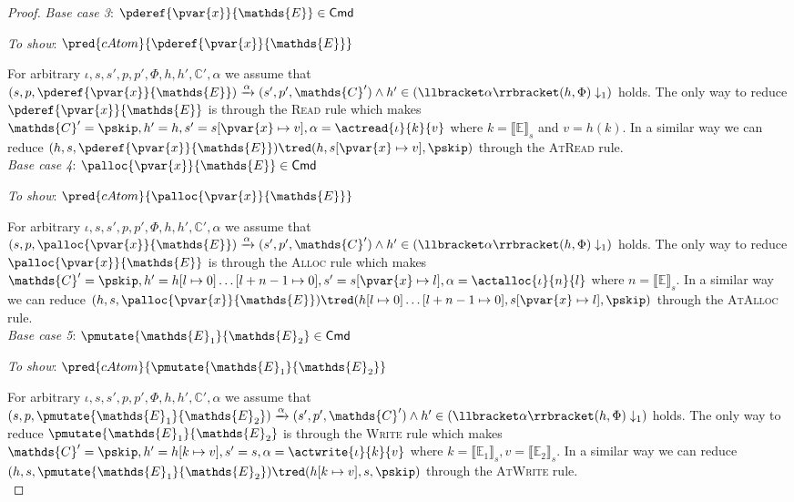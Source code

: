 \begin{lem}
{\begin{proof}
	\textit{Base case 3}: $\pderef{\pvar{x}}{\mathds{E}} \in \mathsf{Cmd}$
	
	\textit{To show}: $\pred{cAtom}{\pderef{\pvar{x}}{\mathds{E}}}$
	
	For arbitrary $\iota, s, s', p, p', \Phi, h, h', \mathds{C}', \alpha$ we assume that $(s, p, \pderef{\pvar{x}}{\mathds{E}}) \xrightarrow{\alpha} (s', p', \mathds{C}') \land h' \in \left( \llbracket \alpha \rrbracket(h, \Phi) \downarrow_1 \right)$ holds. The only way to reduce $\pderef{\pvar{x}}{\mathds{E}}$ is through the \textsc{Read} rule which makes $\mathds{C}' = \pskip, h' = h, s' = s[\pvar{x} \mapsto v], \alpha = \actread{\iota}{k}{v}$ where $k = \llbracket \mathds{E} \rrbracket_s$ and $v = h(k)$. In a similar way we can reduce $(h, s, \pderef{\pvar{x}}{\mathds{E}}) \tred (h, s[\pvar{x} \mapsto v], \pskip)$ through the \textsc{AtRead} rule. \\
	
	\textit{Base case 4}: $\palloc{\pvar{x}}{\mathds{E}} \in \mathsf{Cmd}$
	
	\textit{To show}: $\pred{cAtom}{\palloc{\pvar{x}}{\mathds{E}}}$
	
	For arbitrary $\iota, s, s', p, p', \Phi, h, h', \mathds{C}', \alpha$ we assume that $(s, p, \palloc{\pvar{x}}{\mathds{E}}) \xrightarrow{\alpha} (s', p', \mathds{C}') \land h' \in \left( \llbracket \alpha \rrbracket(h, \Phi) \downarrow_1 \right)$ holds. The only way to reduce $\palloc{\pvar{x}}{\mathds{E}}$ is through the \textsc{Alloc} rule which makes $\mathds{C}' = \pskip, h' = h[l \mapsto 0]\ldots[l + n - 1 \mapsto 0], s' = s[\pvar{x} \mapsto l], \alpha = \actalloc{\iota}{n}{l}$ where $n = \llbracket \mathds{E} \rrbracket_s$. In a similar way we can reduce $(h, s, \palloc{\pvar{x}}{\mathds{E}}) \tred (h[l \mapsto 0]\ldots[l + n - 1 \mapsto 0], s[\pvar{x} \mapsto l], \pskip)$ through the \textsc{AtAlloc} rule. \\
	
	\textit{Base case 5}: $\pmutate{\mathds{E}_1}{\mathds{E}_2} \in \mathsf{Cmd}$
	
	\textit{To show}: $\pred{cAtom}{\pmutate{\mathds{E}_1}{\mathds{E}_2}}$
	
	For arbitrary $\iota, s, s', p, p', \Phi, h, h', \mathds{C}', \alpha$ we assume that $(s, p, \pmutate{\mathds{E}_1}{\mathds{E}_2}) \xrightarrow{\alpha} (s', p', \mathds{C}') \land h' \in \left( \llbracket \alpha \rrbracket(h, \Phi) \downarrow_1 \right)$ holds. The only way to reduce $\pmutate{\mathds{E}_1}{\mathds{E}_2}$ is through the \textsc{Write} rule which makes $\mathds{C}' = \pskip, h' = h[k \mapsto v], s' = s, \alpha = \actwrite{\iota}{k}{v}$ where $k = \llbracket \mathds{E}_1 \rrbracket_s, v = \llbracket \mathds{E}_2 \rrbracket_s$.  In a similar way we can reduce $(h, s, \pmutate{\mathds{E}_1}{\mathds{E}_2}) \tred (h[k \mapsto v], s, \pskip)$ through the \textsc{AtWrite} rule. \\
	

\end{proof}}
\end{lem}
